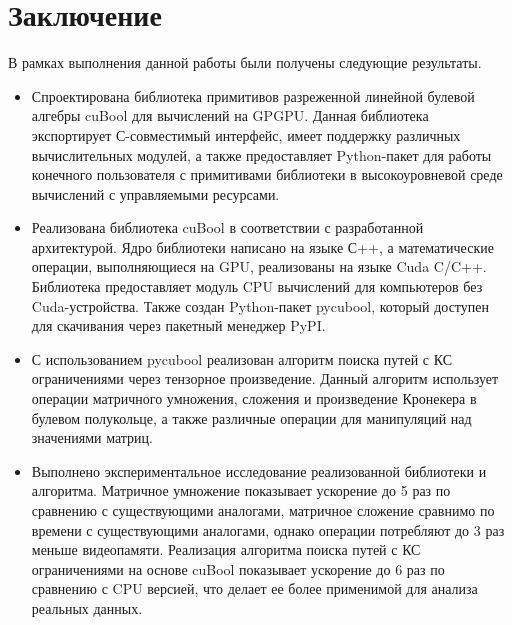 \section{Заключение}

В рамках выполнения данной работы были получены следующие результаты.

\begin{itemize}
    \item Спроектирована библиотека примитивов разреженной линейной булевой алгебры cuBool для вычислений на GPGPU.
    Данная библиотека экспортирует С-совместимый интерфейс, имеет поддержку различных вычислительных модулей, а также предоставляет Python-пакет для работы конечного пользователя с примитивами библиотеки в высокоуровневой среде вычислений с управляемыми ресурсами.

    \item Реализована библиотека cuBool в соответствии с разработанной архитектурой. 
    Ядро библиотеки написано на языке С++, а математические операции, выполняющиеся на GPU, реализованы на языке Cuda C/C++. Библиотека предоставляет модуль CPU вычислений для компьютеров без Cuda-устройства. 
    Также создан Python-пакет pycubool, который доступен для скачивания через пакетный менеджер PyPI.
    
    \item С использованием pycubool реализован алгоритм поиска путей с КС ограничениями через тензорное произведение. 
    Данный алгоритм использует операции матричного умножения, сложения и произведение Кронекера в булевом полукольце, а также различные операции для манипуляций над значениями матриц. 
   
    
    \item Выполнено экспериментальное исследование реализованной библиотеки и алгоритма.
    Матричное умножение показывает ускорение до 5 раз по сравнению с существующими аналогами, 
    матричное сложение сравнимо по времени с существующими аналогами, 
    однако операции потребляют до 3 раз меньше видеопамяти. 
    Реализация алгоритма поиска путей с КС ограничениями на основе cuBool показывает ускорение до 6 раз по сравнению с CPU версией, что делает ее более применимой для анализа реальных данных.
\end{itemize}

